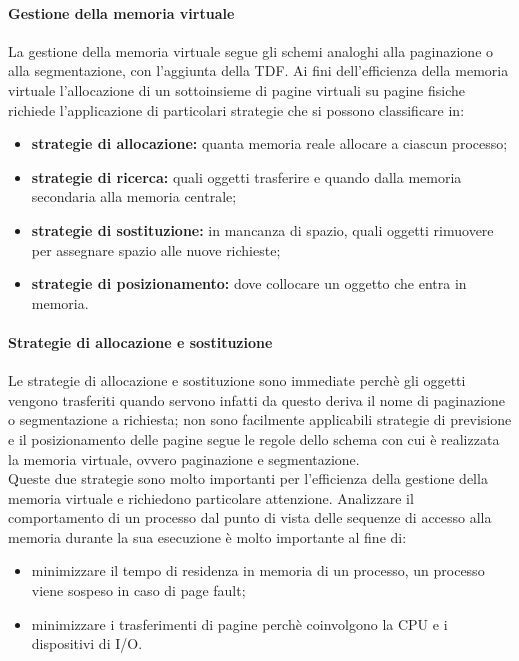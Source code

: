 \documentclass[12pt, letterpaper]{report}
\begin{document}
	\paragraph{Gestione della memoria virtuale} La gestione della memoria virtuale segue gli schemi analoghi alla paginazione o alla segmentazione, con l'aggiunta della TDF. Ai fini dell'efficienza della memoria virtuale l'allocazione di un sottoinsieme di pagine virtuali su pagine fisiche richiede l'applicazione di particolari strategie che si possono classificare in:
	\begin{itemize}
		\item \textbf{strategie di allocazione:} quanta memoria reale allocare a ciascun processo;
		\item \textbf{strategie di ricerca:} quali oggetti trasferire e quando dalla memoria secondaria alla memoria centrale;
		\item \textbf{strategie di sostituzione:} in mancanza di spazio, quali oggetti rimuovere per assegnare spazio alle nuove richieste;
		\item \textbf{strategie di posizionamento:} dove collocare un oggetto che entra in memoria.
	\end{itemize}
	\paragraph{Strategie di allocazione e sostituzione} Le strategie di allocazione e sostituzione sono immediate perchè gli oggetti vengono trasferiti quando servono infatti da questo deriva il nome di paginazione o segmentazione a richiesta; non sono facilmente applicabili strategie di previsione e il posizionamento delle pagine segue le regole dello schema con cui è realizzata la memoria virtuale, ovvero paginazione e segmentazione. \\
	Queste due strategie sono molto importanti per l'efficienza della gestione della memoria virtuale e richiedono particolare attenzione. Analizzare il comportamento di un processo dal punto di vista delle sequenze di accesso alla memoria durante la sua esecuzione è molto importante al fine di:
	\begin{itemize}
		\item minimizzare il tempo di residenza in memoria di un processo, un processo viene sospeso in caso di page fault;
		\item minimizzare i trasferimenti di pagine perchè coinvolgono la CPU e i dispositivi di I/O.
	\end{itemize}
\end{document}
